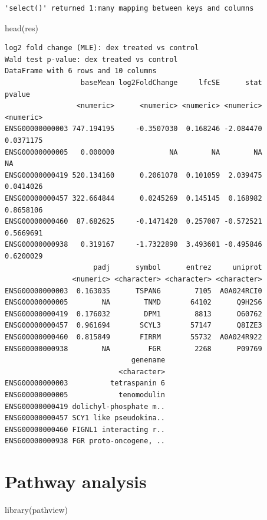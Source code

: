 \documentclass[
  letterpaper,
  DIV=11,
  numbers=noendperiod]{scrartcl}
\newenvironment{Shaded}{\begin{snugshade}}{\end{snugshade}}
\newcommand{\FunctionTok}[1]{\textcolor[rgb]{0.28,0.35,0.67}{#1}}
\newcommand{\NormalTok}[1]{\textcolor[rgb]{0.00,0.23,0.31}{#1}}
\begin{document}
\begin{verbatim}
'select()' returned 1:many mapping between keys and columns
\end{verbatim}

\begin{Shaded}
\begin{Highlighting}[]
\FunctionTok{head}\NormalTok{(res)}
\end{Highlighting}
\end{Shaded}

\begin{verbatim}
log2 fold change (MLE): dex treated vs control 
Wald test p-value: dex treated vs control 
DataFrame with 6 rows and 10 columns
                  baseMean log2FoldChange     lfcSE      stat    pvalue
                 <numeric>      <numeric> <numeric> <numeric> <numeric>
ENSG00000000003 747.194195     -0.3507030  0.168246 -2.084470 0.0371175
ENSG00000000005   0.000000             NA        NA        NA        NA
ENSG00000000419 520.134160      0.2061078  0.101059  2.039475 0.0414026
ENSG00000000457 322.664844      0.0245269  0.145145  0.168982 0.8658106
ENSG00000000460  87.682625     -0.1471420  0.257007 -0.572521 0.5669691
ENSG00000000938   0.319167     -1.7322890  3.493601 -0.495846 0.6200029
                     padj      symbol      entrez     uniprot
                <numeric> <character> <character> <character>
ENSG00000000003  0.163035      TSPAN6        7105  A0A024RCI0
ENSG00000000005        NA        TNMD       64102      Q9H2S6
ENSG00000000419  0.176032        DPM1        8813      O60762
ENSG00000000457  0.961694       SCYL3       57147      Q8IZE3
ENSG00000000460  0.815849       FIRRM       55732  A0A024R922
ENSG00000000938        NA         FGR        2268      P09769
                              genename
                           <character>
ENSG00000000003          tetraspanin 6
ENSG00000000005            tenomodulin
ENSG00000000419 dolichyl-phosphate m..
ENSG00000000457 SCY1 like pseudokina..
ENSG00000000460 FIGNL1 interacting r..
ENSG00000000938 FGR proto-oncogene, ..
\end{verbatim}

\hypertarget{pathway-analysis}{%
\section{Pathway analysis}\label{pathway-analysis}}

\begin{Shaded}
\begin{Highlighting}[]
 \FunctionTok{library}\NormalTok{(pathview)}
\end{Highlighting}
\end{Shaded}
\end{document}
